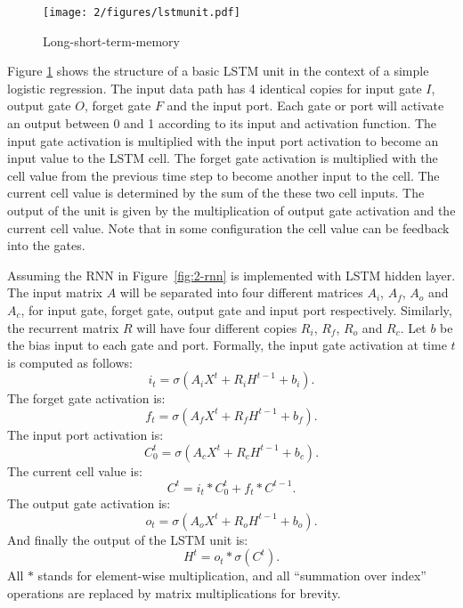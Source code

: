 \begin{figure}[htb]
\centering
\texttt{[image: 2/figures/lstmunit.pdf]}
\caption{Long-short-term-memory}
\label{fig:2-lstmunit}
\end{figure}
Figure \ref{fig:2-lstmunit} shows the structure of a basic LSTM unit\cite{graves2012supervised} in the context of a simple logistic regression. The input data path has 4 identical copies for input gate $I$, output gate $O$, forget gate $F$ and the input port. Each gate or port will activate an output between 0 and 1 according to its input and activation function. The input gate activation is multiplied with the input port activation to become an input value to the LSTM cell. The forget gate activation is multiplied with the cell value from the previous time step to become another input to the cell. The current cell value is determined by the sum of the these two cell inputs. The output of the unit is given by the multiplication of output gate activation and the current cell value. Note that in some configuration the cell value can be feedback into the gates.

Assuming the RNN in Figure~\ref{fig:2-rnn} is implemented with LSTM hidden layer. The input matrix $A$ will be separated into four different matrices $A_i$, $A_f$, $A_o$ and $A_c$, for input gate, forget gate, output gate and input port respectively. Similarly, the recurrent matrix $R$ will have four different copies $R_i$, $R_f$, $R_o$ and $R_c$. Let $b$ be the bias input to each gate and port. Formally, the input gate activation at time $t$ is computed as follows:
\begin{equation}
i_t = \sigma(A_iX^t + R_iH^{t-1}+b_i).
\end{equation}
The forget gate activation is:
\begin{equation}
f_t = \sigma(A_fX^t + R_fH^{t-1}+b_f).
\end{equation}
The input port activation is:
\begin{equation}
C^t_0 = \sigma(A_cX^t + R_cH^{t-1}+b_c).
\end{equation}
The current cell value is:
\begin{equation}
C^t = i_t*C^t_0 + f_t*C^{t-1}.
\end{equation}
The output gate activation is:
\begin{equation}
o_t = \sigma(A_oX^t + R_oH^{t-1}+b_o).
\end{equation}
And finally the output of the LSTM unit is:
\begin{equation}
H^t = o_t*\sigma(C^t).
\end{equation}
All $*$ stands for element-wise multiplication, and all ``summation over index'' operations are replaced by matrix multiplications for brevity. 


